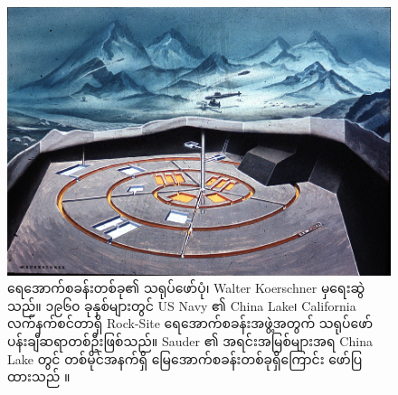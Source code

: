 \documentclass[10pt,twocolumn,letterpaper]{article}
\begin{document}
\begin{figure}[t]
\begin{center}
   \includegraphics[width=1\linewidth]{undersea.jpg}
\end{center}
   \caption{ရေအောက်စခန်းတစ်ခု၏ သရုပ်ဖော်ပုံ၊ Walter Koerschner မှရေးဆွဲသည်။ ၁၉၆၀ ခုနှစ်များတွင် US Navy ၏ China Lake၊ California လက်နက်စင်တာရှိ Rock-Site ရေအောက်စခန်းအဖွဲ့အတွက် သရုပ်ဖော်ပန်းချီဆရာတစ်ဦးဖြစ်သည်။ Sauder ၏ အရင်းအမြစ်များအရ China Lake တွင် တစ်မိုင်အနက်ရှိ မြေအောက်စခန်းတစ်ခုရှိကြောင်း ဖော်ပြထားသည် \cite{22,23}။}
\label{fig:5}
\label{fig:onecol}
\end{figure}
\end{document}
